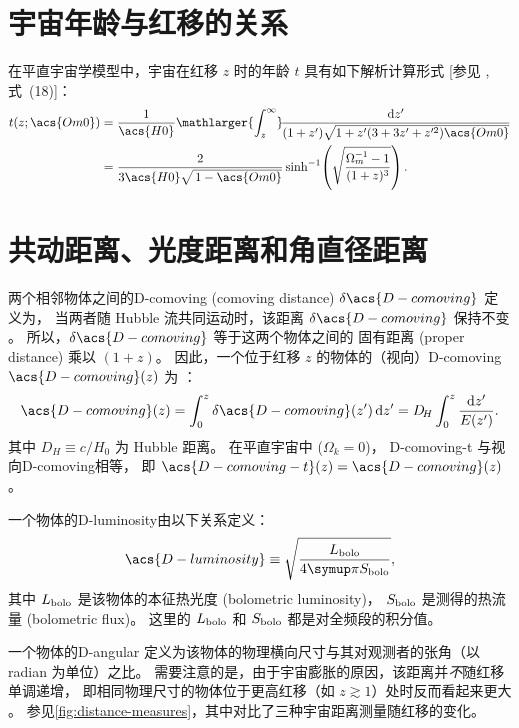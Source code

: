 \section{宇宙年龄与红移的关系}

在平直宇宙学模型中，宇宙在红移 $z$ 时的年龄 $t$ 具有如下解析计算形式
[参见 , 式~(18)]：
\begin{align}
  \label{eq:universe-age}
  t(z; \acs{Om0})
    & = \frac{1}{\acs{H0}} \mathlarger{\int_z^{\infty}}
      \!\frac{\D{z'}}{(1+z')\sqrt{1 + z' (3+3z'+z'^2) \acs{Om0}}}
      \nonumber \\
    & = \frac{2}{3 \acs{H0} \sqrt{\,1-\acs{Om0}}} \sinh^{-1}
      \!\left( \sqrt{\frac{\Omega_m^{-1} - 1}{(1+z)^3}} \right) .
\end{align}


\section{共动距离、光度距离和⻆直径距离}

两个相邻物体之间的\acl{D-comoving} (comoving distance)
$\delta\acs{D-comoving}$ 定义为，
当两者随 Hubble 流共同运动时，该距离 $\delta\acs{D-comoving}$ 保持不变
\cite{hogg1999}。
所以，$\delta\acs{D-comoving}$ 等于这两个物体之间的
固有距离 (proper distance) 乘以 $(1+z)$。
因此，一个位于红移 $z$ 的物体的（视向）\acl{D-comoving}
$\acs{D-comoving}(z)$ 为 \cite{hogg1999}：
\begin{equation}
  \label{eq:distance-comoving}
  \acs{D-comoving}(z)
    = \int_0^z \delta\acs{D-comoving}(z')\,\D{z'}
    = D_{\!H} \int_0^z \frac{\D{z'}}{E(z')} .
\end{equation}
其中 $D_{\!H} \equiv c / H_0$ 为 Hubble 距离。
在平直宇宙中 ($\Omega_k = 0$)，
\acf{D-comoving-t} 与视向\acl{D-comoving}相等，
即 $\acs{D-comoving-t}(z) = \acs{D-comoving}(z)$。

一个物体的\acf{D-luminosity}由以下关系定义：
\begin{equation}
  \label{eq:dl-def}
  \acs{D-luminosity} \equiv
    \sqrt{\frac{L_{\R{bolo}}}{4\Cpi S_{\R{bolo}}}} ,
\end{equation}
其中 $L_{\mathrm{bolo}}$ 是该物体的本征热光度 (bolometric luminosity)，
$S_{\mathrm{bolo}}$ 是测得的热流量 (bolometric flux)。
这里的 $L_{\mathrm{bolo}}$ 和 $S_{\mathrm{bolo}}$ 都是对全频段的积分值。

一个物体的\acf{D-angular}
定义为该物体的物理横向尺寸与其对观测者的张角（以 \si{radian} 为单位）之比。
需要注意的是，由于宇宙膨胀的原因，该距离并\emph{不}随红移单调递增，
即相同物理尺寸的物体位于更高红移（如 $z \gtrsim 1$）处时反而看起来更大
\cite{hogg1999}。
参见\autoref{fig:distance-measures}，其中对比了三种宇宙距离测量随红移的变化。

